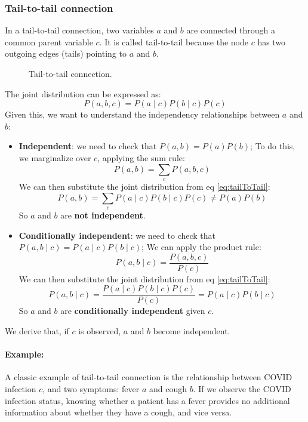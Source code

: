 \subsubsection{Tail-to-tail connection}
In a tail-to-tail connection, two variables $a$ and $b$ are connected through a common parent variable $c$.
It is called tail-to-tail because the node $c$ has two outgoing edges (tails) pointing to $a$ and $b$.
\begin{figure}[H]
\centering
    \caption{Tail-to-tail connection.}
\end{figure}
The joint distribution can be expressed as:
\begin{equation}
    \label{eq:tailToTail}
    P(a, b, c) = P(a \mid c) P(b \mid c) P(c)
\end{equation}
Given this, we want to understand the independency relationships between $a$ and $b$:
\begin{itemize}
    \item \textbf{Independent}: we need to check that $P(a, b) = P(a) P(b)$;
    To do this, we marginalize over $c$, applying the sum rule:
    \[ P(a, b) = \sum_{c} P(a, b, c) \]
    We can then substitute the joint distribution from eq \ref{eq:tailToTail}:
    \[ P(a, b) = \sum_{c} P(a \mid c) P(b \mid c) P(c) \neq P(a) P(b)\]
    So $a$ and $b$ are \textbf{not independent}.
    \item \textbf{Conditionally independent}: we need to check that $P(a, b \mid c) = P(a \mid c) P(b \mid c)$;
    We can apply the product rule:
    \[ P(a, b \mid c) = \frac{P(a, b, c)}{P(c)} \]
    We can then substitute the joint distribution from eq \ref{eq:tailToTail}:
    \[ P(a, b \mid c) = \frac{P(a \mid c) P(b \mid c) P(c)}{P(c)} = P(a \mid c) P(b \mid c) \]
    So $a$ and $b$ are \textbf{conditionally independent} given $c$.
\end{itemize}
We derive that, if $c$ is observed, $a$ and $b$ become independent.
\paragraph{Example:}
A classic example of tail-to-tail connection is the relationship between COVID infection $c$, 
and two symptoms: fever $a$ and cough $b$.
If we observe the COVID infection status, knowing whether a patient has a fever provides no 
additional information about whether they have a cough, and vice versa.

